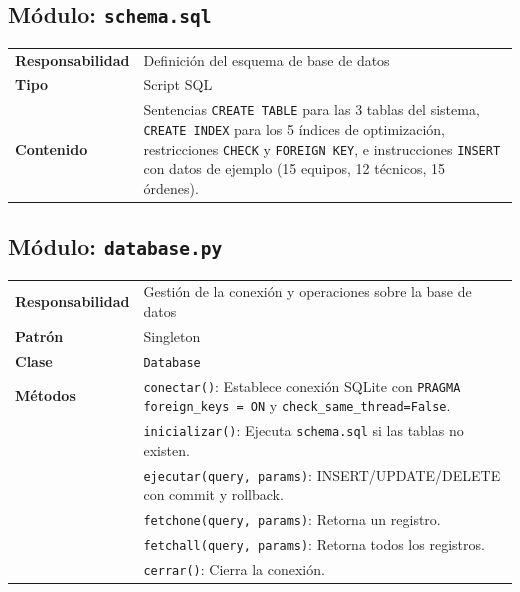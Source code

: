 \documentclass[12pt, a4paper]{article}
\begin{document}
\subsection{Módulo: \texttt{schema.sql}}

\begin{table}[H]
    \centering
    \begin{tabularx}{\textwidth}{l X}
        \toprule
        \textbf{Responsabilidad} & Definición del esquema de base de datos \\
        \textbf{Tipo} & Script SQL \\
        \midrule
        \textbf{Contenido} & Sentencias \texttt{CREATE TABLE} para las 3 tablas del sistema, \texttt{CREATE INDEX} para los 5 índices de optimización, restricciones \texttt{CHECK} y \texttt{FOREIGN KEY}, e instrucciones \texttt{INSERT} con datos de ejemplo (15 equipos, 12 técnicos, 15 órdenes). \\
        \bottomrule
    \end{tabularx}
\end{table}

\subsection{Módulo: \texttt{database.py}}

\begin{table}[H]
    \centering
    \begin{tabularx}{\textwidth}{l X}
        \toprule
        \textbf{Responsabilidad} & Gestión de la conexión y operaciones sobre la base de datos \\
        \textbf{Patrón} & Singleton \\
        \midrule
        \textbf{Clase} & \texttt{Database} \\
        \textbf{Métodos} & \texttt{conectar()}: Establece conexión SQLite con \texttt{PRAGMA foreign\_keys = ON} y \texttt{check\_same\_thread=False}. \\
        & \texttt{inicializar()}: Ejecuta \texttt{schema.sql} si las tablas no existen. \\
        & \texttt{ejecutar(query, params)}: INSERT/UPDATE/DELETE con commit y rollback. \\
        & \texttt{fetchone(query, params)}: Retorna un registro. \\
        & \texttt{fetchall(query, params)}: Retorna todos los registros. \\
        & \texttt{cerrar()}: Cierra la conexión. \\
        \bottomrule
    \end{tabularx}
\end{table}
\end{document}
